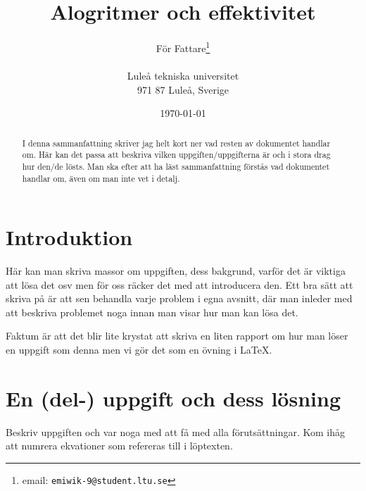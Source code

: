 \documentclass[a4paper,12pt]{article}
\title{Alogritmer och effektivitet}
\author{För Fattare\thanks{email: \texttt{emiwik-9@student.ltu.se}}\\  
        ~ \\
        Luleå tekniska universitet \\ 
        971 87 Luleå, Sverige}
\date{\today}
\begin{document}
\linenumbers


\maketitle


\begin{abstract}
  I denna sammanfattning skriver jag helt kort ner vad resten av
  dokumentet handlar om. Här kan det passa att beskriva vilken
  uppgiften/uppgifterna är och i stora drag hur den/de lösts.
  Man ska efter att ha läst sammanfattning förstås vad dokumentet
  handlar om, även om man inte vet i detalj. 
\end{abstract}


\section{Introduktion}
\label{sec:introduktion}


Här kan man skriva massor om uppgiften, dess bakgrund, varför det är
viktiga att lösa det osv men för oss räcker det med att introducera
den. Ett bra sätt att skriva på är att sen behandla varje problem i
egna avsnitt, där man inleder med att beskriva problemet noga innan
man visar hur man kan lösa det.


Faktum är att det blir lite krystat att skriva en liten rapport om hur
man löser en uppgift som denna men vi gör det som en övning i \LaTeX. 


\section{En (del-) uppgift och dess lösning}
\label{sec:uppg1}


Beskriv uppgiften och var noga med att få med alla förutsättningar.
Kom ihåg att numrera ekvationer som refereras till i löptexten.  
\end{document}
